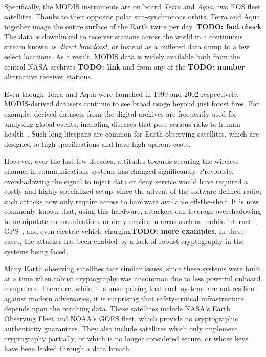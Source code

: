 Specifically, the MODIS instruments are on board \textit{Terra} and \textit{Aqua}, two EOS fleet satellites.
Thanks to their opposite polar sun-synchronous orbits, Terra and Aqua together image the entire surface of the Earth twice per day. \textbf{TODO: fact check}
The data is downlinked to receiver stations across the world in a continuous stream known as \textit{direct broadcast}, or instead as a buffered data dump to a few select locations.
As a result, MODIS data is widely available both from the central NASA archives \textbf{TODO: link} and from any of the \textbf{TODO: number} alternative receiver stations.

Even though Terra and Aqua were launched in 1999 and 2002 respectively, MODIS-derived datasets continue to see broad usage beyond just forest fires.
For example, derived datasets from the digital archives are frequently used for analysing global events, including diseases that pose serious risks to human health~\cite{valleyFever}.
Such long lifespans are common for Earth observing satellites, which are designed to high specifications and have high upfront costs.

However, over the last few decades, attitudes towards securing the wireless channel in communications systems has changed significantly.
Previously, overshadowing the signal to inject data or deny service would have required a costly and highly specialized setup; since the advent of the software-defined radio, such attacks now only require access to hardware available off-the-shelf.
It is now commonly known that, using this hardware, attackers can leverage overshadowing to manipulate communications or deny service in areas such as mobile internet~\cite{yang2019hiding,erni2021adaptover}, GPS~\cite{tippenhauer2011requirements}, and even electric vehicle charging\textbf{TODO: more examples}.
In these cases, the attacker has been enabled by a lack of robust cryptography in the systems being faced.


Many Earth observing satellites face similar issues, since these systems were built at a time when robust cryptography was uncommon due to less powerful onboard computers.
Therefore, while it is unsurprising that such systems are not resilient against modern adversaries, it is surprising that safety-critical infrastructure depends upon the resulting data.
These satellites include NASA's Earth Observing Fleet and NOAA's GOES fleet, which provide no cryptographic authenticity guarantees.
They also include satellites which only implement cryptography partially, or which is no longer considered secure, or whose keys have been leaked through a data breach. %

